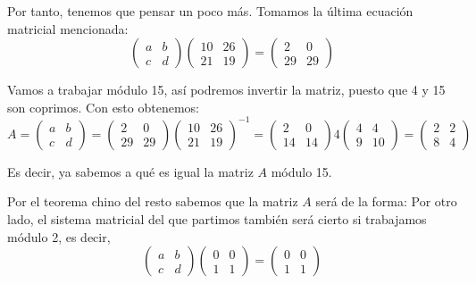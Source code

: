 \begin{problem}[4]
Por tanto, tenemos que pensar un poco más. Tomamos la última ecuación matricial mencionada:
\[
	\left( \begin{array}{cc}
	a & b \\
	c & d
	\end{array} \right)
	\left( \begin{array}{cc}
	10 & 26\\
	21 & 19
	\end{array} \right)
	=
	\left( \begin{array}{cc}
	2 & 0\\
	29 & 29
	\end{array} \right)
\]

Vamos a trabajar módulo 15, así podremos invertir la matriz, puesto que 4 y 15 son coprimos. Con esto obtenemos:
\[
	A = \left( \begin{array}{cc}
	a & b \\
	c & d
	\end{array} \right)
	=
	\left( \begin{array}{cc}
	2 & 0\\
	29 & 29
	\end{array} \right)
	\left( \begin{array}{cc}
	10 & 26\\
	21 & 19
	\end{array} \right)^{-1} = \left( \begin{array}{cc}
	2 & 0\\
	14 & 14
	\end{array} \right) 4 \left( \begin{array}{cc}
	4 & 4\\
	9 & 10
	\end{array} \right) = \left( \begin{array}{cc}
	2 & 2\\
	8 & 4
	\end{array} \right)
\]

Es decir, ya sabemos a qué es igual la matriz $A$ módulo 15.

Por el teorema chino del resto sabemos que la matriz $A$ será de la forma:
Por otro lado, el sistema matricial del que partimos también será cierto si trabajamos módulo 2, es decir,
\[\left( \begin{array}{cc}
	a & b \\
	c & d
	\end{array} \right)
	\left( \begin{array}{cc}
	0 & 0\\
	1 & 1
	\end{array} \right)
	=
	\left( \begin{array}{cc}
	0 & 0\\
	1 & 1
	\end{array} \right)
\]
\end{problem}

